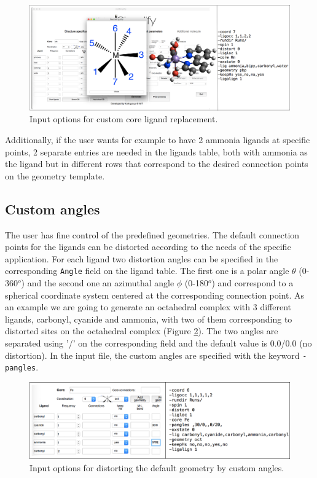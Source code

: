 \documentclass[a4paper,12pt]{assignment}
\begin{document}
\begin{figure}[htb!]
\centering
\includegraphics[width=\textwidth]{./Figures/fig12.png}
\caption{Input options for custom core ligand replacement.}
\label{ord}
\end{figure}

Additionally, if the user wants for example to have 2 ammonia ligands at specific points, 2 separate entries are needed in the ligands table, both with ammonia as the ligand but in different rows that correspond to the desired connection points on the geometry template.

\subsection{Custom angles}\label{cangle}

The user has fine control of the predefined geometries. The default connection points for the ligands can be distorted according to the needs of the specific application. For each ligand two distortion angles can be specified in the corresponding \texttt{Angle} field on the ligand table. The first one is a polar angle $\theta$ (0-360$^o$) and the second one an azimuthal angle $\phi$ (0-180$^o$) and correspond to a spherical coordinate system centered at the corresponding connection point. As an example we are going to generate an octahedral complex with 3 different ligands, carbonyl, cyanide and ammonia, with two of them corresponding to distorted sites on the octahedral complex (Figure \ref{lang1}). The two angles are separated using '/' on the corresponding field and the default value is 0.0/0.0 (no distortion). In the input file, the custom angles are specified with the keyword \texttt{-pangles}.

\begin{figure}[htb!]
\centering
\includegraphics[width=\textwidth]{./Figures/fig13a.png}
\caption{Input options for distorting the default geometry by custom angles.}
\label{lang1}
\end{figure}
\end{document}
